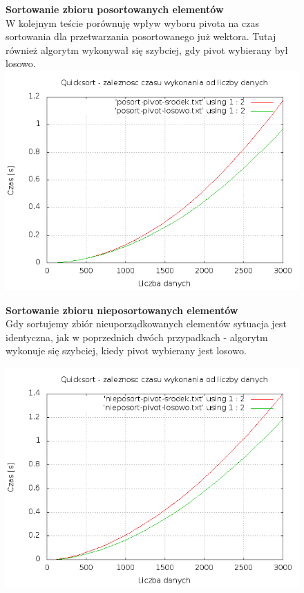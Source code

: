 \documentclass[a4paper,11pt]{report}
\begin{document}
\begin{figure}
  \begin{center}
  \textbf{Sortowanie zbioru posortowanych elementów}
\\W kolejnym teście porównuję wpływ wyboru pivota na czas sortowania dla przetwarzania posortowanego już wektora. Tutaj również algorytm wykonywał się szybciej, gdy pivot wybierany był losowo.
\\
\includegraphics[scale=0.5]{./posortowane.png}
  \end{center}
\end{figure}

\begin{figure}
  \begin{center}
  \textbf{Sortowanie zbioru nieposortowanych elementów}
\\
Gdy sortujemy zbiór nieuporządkowanych elementów sytuacja jest identyczna, jak w poprzednich dwóch przypadkach - algorytm wykonuje się szybciej, kiedy pivot wybierany jest losowo.

    \includegraphics[scale=0.5]{./nieposotrowane.png}
    \label{fig:}
  \end{center}
\end{figure}
\end{document}
